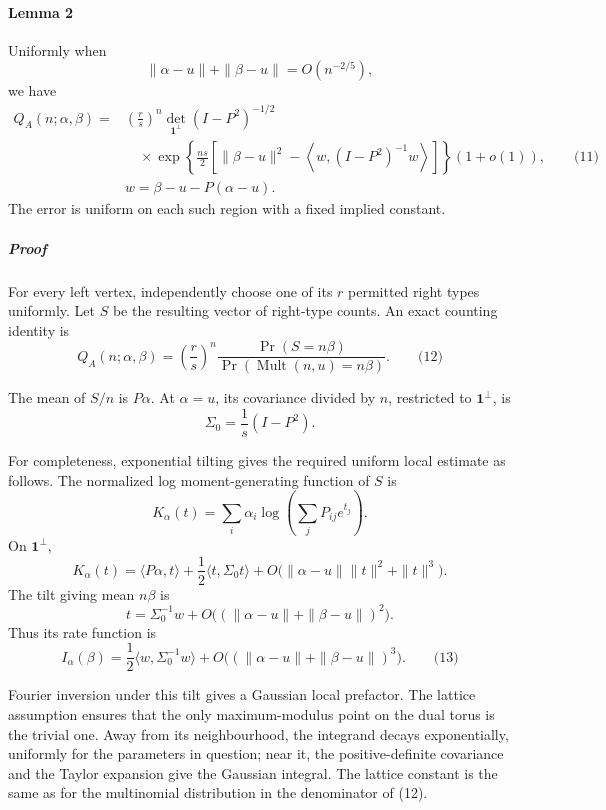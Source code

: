 \documentclass[
  11pt,
  a4paper,
]{article}
\begin{document}
\paragraph{Lemma 2}\label{lemma-2}

Uniformly when \[
\|\alpha-u\|+\|\beta-u\|=O(n^{-2/5}),
\] we have \begin{equation*}
\begin{split}
Q_A(n;\alpha,\beta)
={}&\left(\frac rs\right)^n
 \det_{\mathbf1^\perp}(I-P^2)^{-1/2}\\
&\quad{}\times
 \exp\left\{\frac{ns}{2}
 \left[
 \|\beta-u\|^2
 -\left\langle w,(I-P^2)^{-1}w\right\rangle
 \right]\right\}(1+o(1)),                                      \qquad\text{(11)}\\
&w=\beta-u-P(\alpha-u).
\end{split}
\end{equation*} The error is uniform on each such region with a fixed
implied constant.

\subparagraph{Proof}\label{proof-1}

For every left vertex, independently choose one of its \(r\) permitted
right types uniformly. Let \(S\) be the resulting vector of right-type
counts. An exact counting identity is \[
Q_A(n;\alpha,\beta)
 =
 \left(\frac rs\right)^n
 \frac{\Pr(S=n\beta)}
 {\Pr(\operatorname{Mult}(n,u)=n\beta)}.                         \qquad\text{(12)}
\]

The mean of \(S/n\) is \(P\alpha\). At \(\alpha=u\), its covariance
divided by \(n\), restricted to \(\mathbf1^\perp\), is \[
\Sigma_0=\frac1s(I-P^2).
\]

For completeness, exponential tilting gives the required uniform local
estimate as follows. The normalized log moment-generating function of
\(S\) is \[
K_\alpha(t)
 =\sum_i\alpha_i\log\left(\sum_j P_{ij}e^{t_j}\right).
\] On \(\mathbf1^\perp\), \[
K_\alpha(t)
 =\langle P\alpha,t\rangle
  +\frac12\langle t,\Sigma_0t\rangle
  +O\bigl(\|\alpha-u\|\|t\|^2+\|t\|^3\bigr).
\] The tilt giving mean \(n\beta\) is \[
t=\Sigma_0^{-1}w+O\bigl((\|\alpha-u\|+\|\beta-u\|)^2\bigr).
\] Thus its rate function is \[
I_\alpha(\beta)
 =\frac12\langle w,\Sigma_0^{-1}w\rangle
  +O\bigl((\|\alpha-u\|+\|\beta-u\|)^3\bigr).                    \qquad\text{(13)}
\]

Fourier inversion under this tilt gives a Gaussian local prefactor. The
lattice assumption ensures that the only maximum-modulus point on the
dual torus is the trivial one. Away from its neighbourhood, the
integrand decays exponentially, uniformly for the parameters in
question; near it, the positive-definite covariance and the Taylor
expansion give the Gaussian integral. The lattice constant is the same
as for the multinomial distribution in the denominator of (12).
\end{document}
